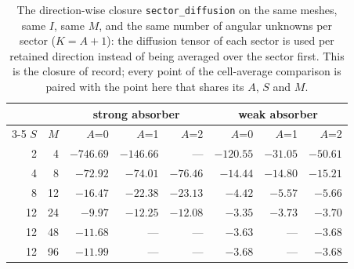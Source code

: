 \begin{table}[htbp]
\centering
\caption{The direction-wise closure \texttt{sector\_diffusion} on the same meshes, same $I$, same $M$, and the same number of angular unknowns per sector ($K=A+1$): the diffusion tensor of each sector is used per retained direction instead of being averaged over the sector first. This is the closure of record; every point of the cell-average comparison is paired with the point here that shares its $A$, $S$ and $M$.}
\label{tab:study4-checker-sector}
\centering\small
\begin{tabular}{rrrrrrrr}
\hline
& & \multicolumn{3}{c}{strong absorber} &
  \multicolumn{3}{c}{weak absorber}\\
\cline{3-5}\cline{6-8}
$S$ & $M$ & $A$=0 & $A$=1 & $A$=2 & $A$=0 & $A$=1 & $A$=2\\
\hline
2 & 4 & $-746.69$ & $-146.66$ & --- & $-120.55$ & $-31.05$ & $-50.61$\\
4 & 8 & $-72.92$ & $-74.01$ & $-76.46$ & $-14.44$ & $-14.80$ & $-15.21$\\
8 & 12 & $-16.47$ & $-22.38$ & $-23.13$ & $-4.42$ & $-5.57$ & $-5.66$\\
12 & 24 & $-9.97$ & $-12.25$ & $-12.08$ & $-3.35$ & $-3.73$ & $-3.70$\\
12 & 48 & $-11.68$ & --- & --- & $-3.63$ & --- & $-3.68$\\
12 & 96 & $-11.99$ & --- & --- & $-3.68$ & --- & $-3.68$\\
\hline
\end{tabular}
\end{table}
